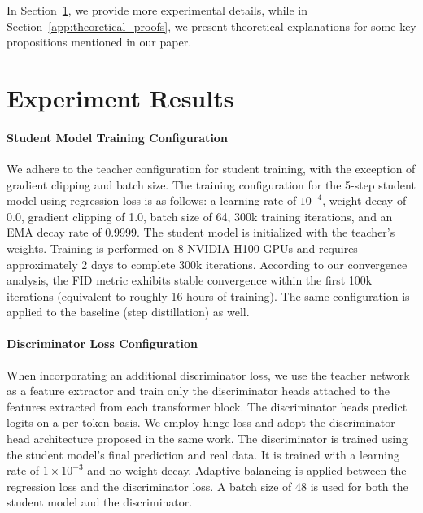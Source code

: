 \documentclass{article}
\theoremstyle{plain}
\theoremstyle{definition}
\theoremstyle{remark}
\begin{document}
\newpage
\appendix
\onecolumn
In Section~\ref{SectionA}, we provide more experimental details, while in Section~\ref{app:theoretical_proofs}, we present theoretical explanations for some key propositions mentioned in our paper.


\section{Experiment Results}
\label{SectionA}
\paragraph{Student Model Training Configuration}
We adhere to the teacher configuration for student training, with the exception of gradient clipping and batch size. The training configuration for the 5-step student model using regression loss is as follows: a learning rate of $10^{-4}$, weight decay of 0.0, gradient clipping of 1.0, batch size of 64, 300k training iterations, and an EMA decay rate of 0.9999. The student model is initialized with the teacher's weights. Training is performed on 8 NVIDIA H100 GPUs and requires approximately 2 days to complete 300k iterations. According to our convergence analysis, the FID metric exhibits stable convergence within the first 100k iterations (equivalent to roughly 16 hours of training). The same configuration is applied to the baseline (step distillation) as well.

\paragraph{Discriminator Loss Configuration} 
When incorporating an additional discriminator loss, we use the teacher network as a feature extractor and train only the discriminator heads attached to the features extracted from each transformer block. The discriminator heads predict logits on a per-token basis. We employ hinge loss and adopt the discriminator head architecture proposed in the same work. The discriminator is trained using the student model's final prediction and real data. It is trained with a learning rate of $1\times10^{-3}$ and no weight decay. Adaptive balancing is applied between the regression loss and the discriminator loss. A batch size of 48 is used for both the student model and the discriminator.
\end{document}
